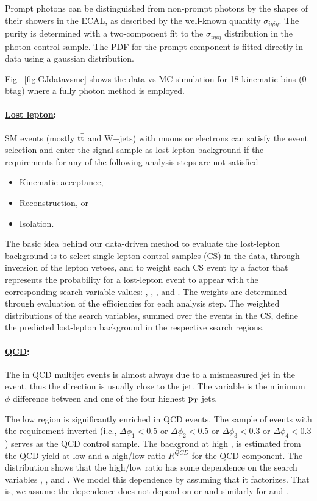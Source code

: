 Prompt photons can be distinguished from non-prompt photons by the shapes of their 
showers in the ECAL, as described by the well-known quantity $\sigma_{i\eta i\eta}$.  
The purity is determined with a two-component fit to the $\sigma_{i\eta i\eta}$ distribution 
in the photon control sample.  The PDF for the prompt component is fitted directly in data
using a gaussian distribution.

Fig ~\ref{fig:GJdatavsmc} shows the data vs MC simulation for 18 kinematic bins (0-btag) where a fully photon method is employed. 
\paragraph{\underline{Lost lepton}: }
SM events (mostly $\rm t\bar{t}$ and W+jets) with muons or electrons
can satisfy the event selection and enter the signal sample as lost-lepton background
if the requirements for any of the following analysis steps are not satisfied

\begin{itemize}
\item Kinematic acceptance,
\item Reconstruction, or
\item Isolation.
\end{itemize}
The basic idea behind our data-driven method to evaluate
the lost-lepton background is to select
single-lepton control samples (CS) in the data,
through inversion of the lepton vetoes,
and to weight each CS event
by a factor that represents the probability for a lost-lepton event
to appear with
the corresponding search-variable values: \HT, \MHT, \njets, and \nbjets.
The weights are determined through evaluation of the efficiencies
for each analysis step.
The weighted distributions of the search variables,
summed over the events in the CS,
define the predicted lost-lepton background in the respective search regions.
\paragraph{\underline{QCD}: }
The \MHT in QCD multijet events is almost always due to a mismeasured jet in the event,
       thus the \MHT direction is usually close to the jet.
       The \dphi variable is the minimum $\phi$ difference between \MHT and one of the four
       highest $\rm p_{T}$ jets.


       The low \dphi region is significantly enriched in QCD events.
       The sample of events with the \dphi requirement inverted
       (i.e., $\Delta \phi_1<0.5$ or $\Delta \phi_2<0.5$ or $\Delta \phi_3<0.3$ or $\Delta \phi_4<0.3$)
       serves as the QCD control sample.
       The backgrond at high \dphi, is estimated from the QCD yield at low
       \dphi and a high/low ratio $R^{QCD}$ for the QCD component.
       The \dphi distribution  shows that the high/low ratio
       has some dependence on the search variables \HT, \MHT, and \njets.
       We model this dependence by assuming that it factorizes.  That is, we assume the \HT
       dependence does not depend on \MHT or \njets and similarly for \MHT and \njets.
